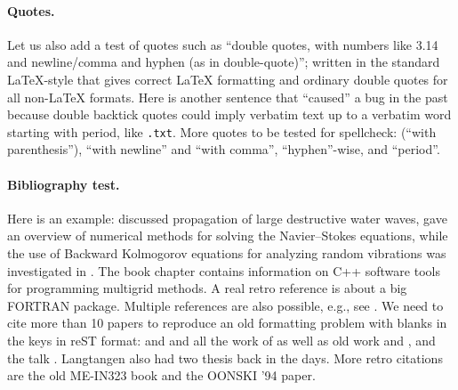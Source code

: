 \documentclass[%
oneside,                 %
final,                   %
10pt]{article}
\newenvironment{doconceexercise}{}{}
\newcounter{doconceexercisecounter}
\theoremstyle{definition}
\begin{document}
\begin{enumerate}
\eccq

\paragraph{Quotes.}
Let us also add a test of quotes such as ``double quotes, with numbers
like 3.14 and newline/comma and hyphen (as in double-quote)''; written
in the standard LaTeX-style that gives correct {\LaTeX} formatting and
ordinary double quotes for all non-LaTeX formats.  Here is another
sentence that ``caused'' a bug in the past because double backtick
quotes could imply verbatim text up to a verbatim word starting with
period, like \texttt{.txt}.
More quotes to be tested for spellcheck:
(``with parenthesis''), ``with newline''
and ``with comma'', ``hyphen''-wise, and ``period''.
\paragraph{Bibliography test.}
Here is an example: \cite{Langtangen_Pedersen_2002} discussed propagation of
large destructive water waves, \cite{Langtangen_et_al_2002} gave
an overview of numerical methods for solving the Navier--Stokes equations,
while the use of Backward Kolmogorov equations for analyzing
random vibrations was investigated in \cite{Langtangen_1994a}.
The book chapter \cite{Mardal_et_al_2003a} contains information on
C++ software tools for programming multigrid methods. A real retro
reference is \cite{Langtangen_1988d} about a big FORTRAN package.
Multiple references are also possible, e.g., see
\cite{Langtangen_Pedersen_2002,Mardal_et_al_2003a}.
We need to cite more than 10 papers to reproduce an old formatting
problem with blanks in the keys in reST format:
\cite{Langtangen_1992c,Langtangen_1994a,Mortensen_et_al_2011,Langtangen_Pedersen_2002}
and
\cite{Langtangen_et_al_2002,Glimsdal_et_al_20006,Rahman_et_al_2006b,Haga_et_al_2011a,Langtangen_2003a,Langtangen_2008a,Langtangen:95}
and all the work of
\cite{Langtangen_2012,Mardal_et_al_2003a,Jeberg_et_al_2004} as well as
old work \cite{Langtangen_1988d} and \cite{Langtangen_1989e}, and the
talk \cite{Langtangen_talk_2007a}.
Langtangen also had two thesis \cite{Langtangen:85,Langtangen_1989e}
back in the days.
More retro citations are
the old ME-IN323 book \cite{Langtangen:91} and the
\cite{Langtangen:94b} OONSKI '94 paper.
\begin{doconceexercise}
                             

\end{doconceexercise}
\end{enumerate}
\end{document}
